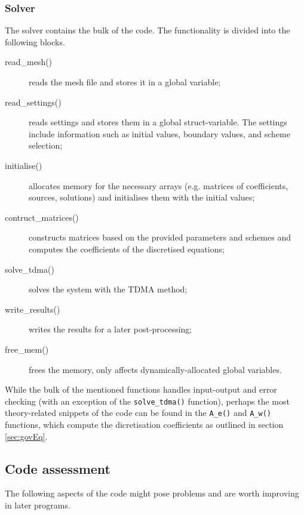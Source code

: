 \documentclass[12pt]{article}
\begin{document}
\subsubsection{Solver}
\label{sec:solver}

The solver contains the bulk of the code. The functionality is divided into the following blocks.

\begin{description}
\item[read\_mesh()] reads the mesh file and stores it in a global variable;
\item[read\_settings()] reads settings and stores them in a global struct-variable. The settings include information such as initial values, boundary values, and scheme selection;
\item[initialise()] allocates memory for the necessary arrays (e.g. matrices of coefficients, sources, solutions) and initialises them with the initial values;
\item[contruct\_matrices()] constructs matrices based on the provided parameters and schemes and computes the coefficients of the discretised equations;
\item[solve\_tdma()] solves the system with the TDMA method;
\item[write\_results()] writes the results for a later post-processing;
\item[free\_mem()] frees the memory, only affects dynamically-allocated global variables.
\end{description}

While the bulk of the mentioned functions handles input-output and error checking (with an exception of the \verb|solve_tdma()| function), perhaps the most theory-related snippets of the code can be found in the \verb|A_e()| and \verb|A_w()| functions, which compute the dicretisation coefficients as outlined in section \ref{sec:govEq}.


\subsection{Code assessment}
\label{sec:assessment}

The following aspects of the code might pose problems and are worth improving in later programs.
\end{document}
